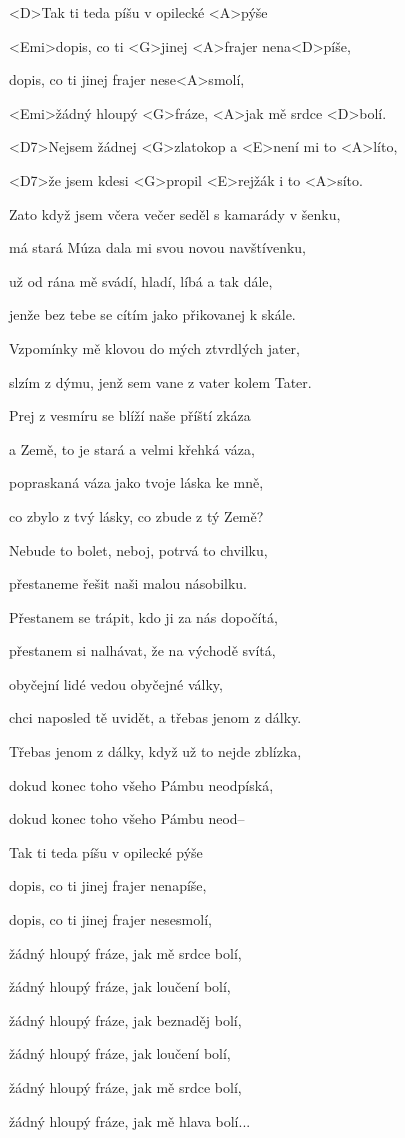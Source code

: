 

\zs
<D>Tak ti teda píšu v opilecké <A>pýše

<Emi>dopis, co ti <G>jinej <A>frajer nena<D>píše,

dopis, co ti jinej frajer nese<A>smolí,

<Emi>žádný hloupý <G>fráze, <A>jak mě srdce <D>bolí.
\ks

\zr
<D7>Nejsem žádnej <G>zlatokop a <E>není mi to <A>líto,

<D7>že jsem kdesi <G>propil <E>rejžák i to <A>síto.
\kr

\zs
Zato když jsem včera večer seděl s kamarády v šenku,

má stará Múza dala mi svou novou navštívenku,

už od rána mě svádí, hladí, líbá a tak dále,

jenže bez tebe se cítím jako přikovanej k skále.
\ks

\zr
Vzpomínky mě klovou do mých ztvrdlých jater,

slzím z dýmu, jenž sem vane z vater kolem Tater.
\kr

\zs
Prej z vesmíru se blíží naše příští zkáza

a Země, to je stará a velmi křehká váza,

popraskaná váza jako tvoje láska ke mně,

co zbylo z tvý lásky, co zbude z tý Země?
\ks

\zr
Nebude to bolet, neboj, potrvá to chvilku,

přestaneme řešit naši malou násobilku.
\kr

\zs
Přestanem se trápit, kdo ji za nás dopočítá,

přestanem si nalhávat, že na východě svítá,

obyčejní lidé vedou obyčejné války,

chci naposled tě uvidět, a třebas jenom z dálky.
\ks

\zs
Třebas jenom z dálky, když už to nejde zblízka,

dokud konec toho všeho Pámbu neodpíská,

dokud konec toho všeho Pámbu neod--
\ks

\zs
Tak ti teda píšu v opilecké pýše

dopis, co ti jinej frajer nenapíše,

dopis, co ti jinej frajer nesesmolí,

žádný hloupý fráze, jak mě srdce bolí,

žádný hloupý fráze, jak loučení bolí,

žádný hloupý fráze, jak beznaděj bolí,

žádný hloupý fráze, jak loučení bolí,

žádný hloupý fráze, jak mě srdce bolí,

žádný hloupý fráze, jak mě hlava bolí...
\ks

\kp
